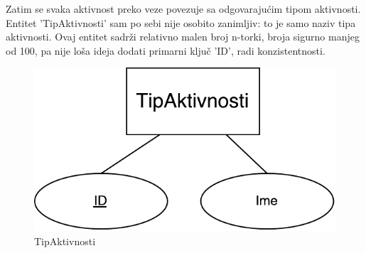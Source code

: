 \documentclass[times, utf8, zavrsni]{fer}
\begin{document}
Zatim se svaka aktivnost preko veze povezuje sa odgovarajućim tipom aktivnosti. Entitet 'TipAktivnosti' sam po sebi nije osobito zanimljiv: to je samo naziv tipa aktivnosti. Ovaj entitet sadrži relativno malen broj n-torki, broja sigurno manjeg od 100, pa nije loša ideja dodati primarni ključ 'ID', radi konzistentnosti.\\

\begin{figure}[H]
\centering
\includegraphics[keepaspectratio]{img/tip-aktivnosti.pdf}
\caption{TipAktivnosti}
\label{fig:tip-aktivnosti}
\end{figure}
\end{document}
